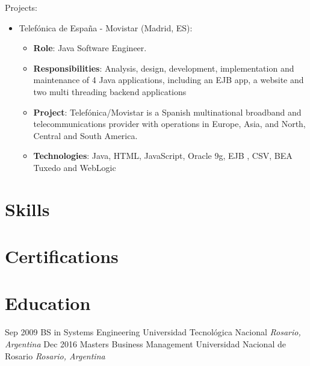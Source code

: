 \documentclass[11pt,a4paper,sans]{moderncv}        %
\begin{document}
  {
    Projects:\\
    \begin{itemize}
      \item Telefónica de España - Movistar (Madrid, ES):
        \begin{itemize}
          \item \textbf{Role}: Java Software Engineer. 
          \item \textbf{Responsibilities}:  Analysis, design, development, implementation and maintenance of 4 Java applications, including an EJB app, a website and two multi threading backend applications
          \item \textbf{Project}: Telefónica/Movistar is a Spanish multinational broadband and telecommunications provider with operations in Europe, Asia, and North, Central and South America.
          \item \textbf{Technologies}: Java, HTML, JavaScript, Oracle 9g, EJB , CSV, BEA Tuxedo and WebLogic
        \end{itemize}
    \end{itemize}
  }

\section{Skills}

\section{Certifications}

\section{Education}
\cventry
{Sep 2009}
{BS in Systems Engineering}
{Universidad Tecnológica Nacional}
{}
{\textit{Rosario, Argentina}}
{}
\cventry
{Dec 2016}
{Masters Business Management}
{Universidad Nacional de Rosario}
{}
{\textit{Rosario, Argentina}}
{}
\vspace{1mm}
\end{document}
